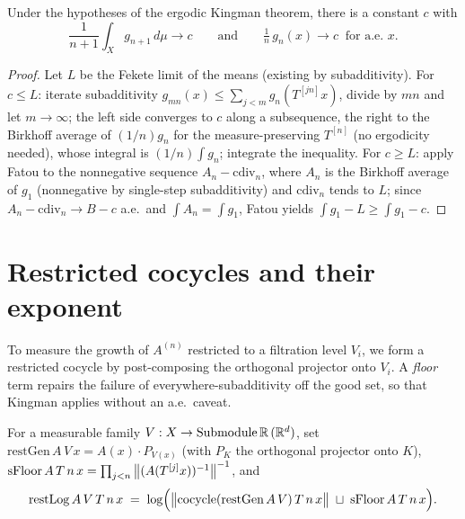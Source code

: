 \begin{proposition}\label{tendsto_kingman_ergodic_means}
  \leanok
  Under the hypotheses of the ergodic Kingman theorem, there is a constant \(c\) with
  \[
    \frac{1}{n+1}\int_X g_{n+1}\,d\mu \longrightarrow c \qquad\text{and}\qquad \tfrac{1}{n}\,g_n(x) \longrightarrow c \ \text{ for a.e. } x.
  \]
\end{proposition}
\begin{proof}\leanok
  Let \(L\) be the Fekete limit of the means (existing by subadditivity). For \(c \le L\): iterate subadditivity \(g_{mn}(x) \le \sum_{j<m} g_n(T^{[jn]}x)\), divide by \(mn\) and let \(m\to\infty\); the left side converges to \(c\) along a subsequence, the right to the Birkhoff average of \((1/n)g_n\) for the measure-preserving \(T^{[n]}\) (no ergodicity needed), whose integral is \((1/n)\int g_n\); integrate the inequality. For \(c \ge L\): apply Fatou to the nonnegative sequence \(A_n - \mathrm{cdiv}_n\), where \(A_n\) is the Birkhoff average of \(g_1\) (nonnegative by single-step subadditivity) and \(\mathrm{cdiv}_n\) tends to \(L\); since \(A_n - \mathrm{cdiv}_n \to B - c\) a.e.\ and \(\int A_n = \int g_1\), Fatou yields \(\int g_1 - L \ge \int g_1 - c\).
\end{proof}

\section{Restricted cocycles and their exponent}

To measure the growth of \(A^{(n)}\) restricted to a filtration level \(V_i\), we form a restricted cocycle by post-composing the orthogonal projector onto \(V_i\). A \emph{floor} term repairs the failure of everywhere-subadditivity off the good set, so that Kingman applies without an a.e.\ caveat.

\begin{definition}\label{restLog}
  \leanok
  For a measurable family \(V : X \to \mathrm{Submodule}\,\mathbb{R}\,(\mathbb{R}^d)\), set \(\mathrm{restGen}\,A\,V\,x = A(x)\cdot P_{V(x)}\) (with \(P_K\) the orthogonal projector onto \(K\)), \(\mathrm{sFloor}\,A\,T\,n\,x = \prod_{j<n}\left\lVert (A(T^{[j]}x))^{-1} \right\rVert^{-1}\), and
  \[
    \mathrm{restLog}\,A\,V\,T\,n\,x \;=\; \log\Bigl(\bigl\lVert \mathrm{cocycle}(\mathrm{restGen}\,A\,V)\,T\,n\,x \bigr\rVert \;\sqcup\; \mathrm{sFloor}\,A\,T\,n\,x\Bigr).
  \]
\end{definition}

